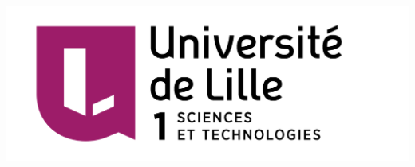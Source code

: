 \begin{center}
\qquad\qquad
\includegraphics[scale=0.15]{../autres/Logo-Univ-Lille-1-new.png}\qquad
{}
\end{center}

\printindex
{}

